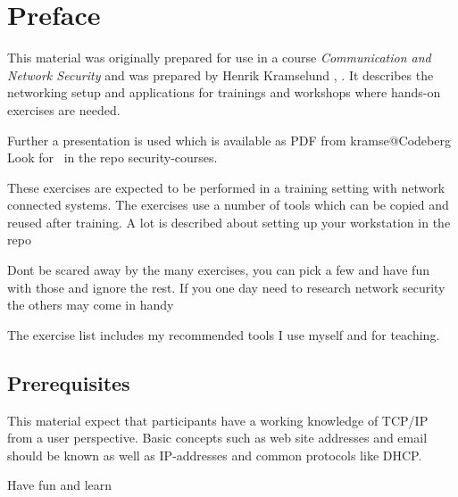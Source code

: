 \documentclass[a4paper,11pt,notitlepage]{report}
\begin{document}
\rm
{}
\newcommand{\subject}[1]{Networking and TCP/IP for Beginners workshop}

\setcounter{tocdepth}{0}

{\color{titlecolor}
\renewcommand{\baselinestretch}{0.3}\setlength{\parskip}{1mm}
\tableofcontents}

\normal
\pagestyle{fancyplain}
\chapter*{\color{titlecolor}Preface}

This material was originally prepared for use in a course \emph{Communication and Network Security } and was prepared by Henrik Kramselund  ,  .
It describes the networking setup and applications for trainings and workshops where hands-on exercises are needed.

Further a presentation is used which is available as PDF from kramse@Codeberg\\
Look for \jobname\ in the repo security-courses.

These exercises are expected to be performed in a training setting with network connected systems. The exercises use a number of tools which can be copied and reused after training. A lot is described about setting up your workstation in the repo


Dont be scared away by the many exercises, you can pick a few and have fun with those and ignore the rest. If you one day need to research network security the others may come in handy \smiley

The exercise list includes my recommended tools I use myself and for teaching.

\section*{\color{titlecolor}Prerequisites}

This material expect that participants have a working knowledge of
TCP/IP from a user perspective. Basic concepts such as web site addresses and email should be known as well as IP-addresses and common protocols like DHCP.


\vskip 1cm
Have fun and learn
\end{document}
